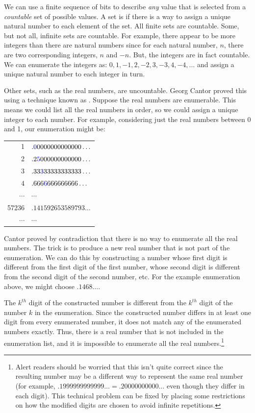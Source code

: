  We can use a finite sequence of bits to describe {\em any} value that is selected from a \emph{countable} set of possible values.  A set is  if there is a way to assign a unique natural number to each element of the set.  All finite sets are countable.  Some, but not all, infinite sets are countable.  For example, there appear to be more integers than there are natural numbers since for each natural number, $n$, there are two corresponding integers, $n$ and $-n$.  But, the integers are in fact countable.  We can enumerate the integers as: $0, 1, -1, 2, -2, 3, -3, 4, -4, \ldots$ and assign a unique natural number to each integer in turn.  

Other sets, such as the real numbers, are uncountable.  Georg Cantor proved this using a technique known as .  Suppose the real numbers are enumerable.  This means we could list all the real numbers in order, so we could assign a unique integer to each number.  For example, considering just the real numbers between 0 and 1, our enumeration might be:

\begin{tabular}[c]{rl}
1     & $.\textcolor{blue}{0}0000000000000\ldots$ \\
2     & $.2\textcolor{blue}{5}000000000000\ldots$ \\
3     & $.33\textcolor{blue}{3}33333333333\ldots$ \\
4     & $.666\textcolor{blue}{6}666666666\ldots$ \\
$\cdots$ & $\cdots$ \\
57236 & $.141592653589793\ldots$\\
$\cdots$ & $\cdots$ \\
\end{tabular}

Cantor proved by contradiction that there is no way to enumerate all the real numbers.  The trick is to produce a new real number that is not part of the enumeration.  We can do this by constructing a number whose first digit is different from the first digit of the first number, whose second digit is different from the second digit of the second number, etc.  For the example enumeration above, we might choose $.1468\ldots$.  

The $k^{th}$ digit of the constructed number is different from the $k^{th}$ digit of the number $k$ in the enumeration.  Since the constructed number differs in at least one digit from every enumerated number, it does not match any of the enumerated numbers exactly.  Thus, there is a real number that is not included in the enumeration list, and it is impossible to enumerate all the real numbers.\footnote{Alert readers should be worried that this isn't quite correct since the resulting number may be a different way to represent the same real number (for example, $.1999999999999\ldots = .20000000000\ldots$ even though they differ in each digit).  This technical problem can be fixed by placing some restrictions on how the modified digits are chosen to avoid infinite repetitions.}

